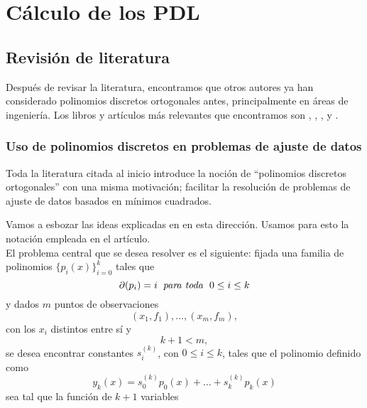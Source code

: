 \chapter{Cálculo de los PDL}

\section{Revisión de literatura}
Después de revisar la literatura, encontramos que
otros autores ya han considerado polinomios discretos ortogonales
antes, principalmente en áreas de ingeniería.
Los libros y artículos más relevantes
que encontramos son
\cite{Neuman}, \cite{papel}, \cite{george},
\cite{himmelblau}
y \cite{rabin}. 


\subsection{Uso de polinomios discretos en problemas de ajuste de datos}
Toda la literatura citada al inicio introduce
la noción de ``polinomios discretos ortogonales''
con una misma motivación; facilitar la resolución
de problemas de ajuste de datos basados en mínimos cuadrados.

Vamos a esbozar las ideas explicadas en
\cite{george} en esta dirección. Usamos
para esto la notación empleada
en el artículo. \\

El problema central que se desea resolver es
el siguiente:
fijada una familia de polinomios
$\{ p_{i}(x) \}_{i= 0}^{k}$ tales que
\begin{equation}
\label{ec: george 14}
\partial (p_{i}) = i \hspace{0.2cm}
\textit{para toda } \hspace{0.1cm} 0 \leq i \leq k
\end{equation}
y
dados $m$ puntos de observaciones
\[
(x_{1}, f_{1}), \ldots , (x_{m}, f_{m}),
\]
con los $x_{i}$ distintos entre sí y 
\begin{equation}
\label{eq0: 7May}
k+1 < m, 
\end{equation}
se desea encontrar
constantes $s_{i}^{(k)}$,
con $0 \leq i \leq k$, tales que 
el polinomio definido como
\[
y_{k}(x) = s_{0}^{(k)} p_{0}(x) + \ldots +  
s_{k}^{(k)} p_{k}(x) 
\]
sea tal que 
la función de $k+1$ variables

